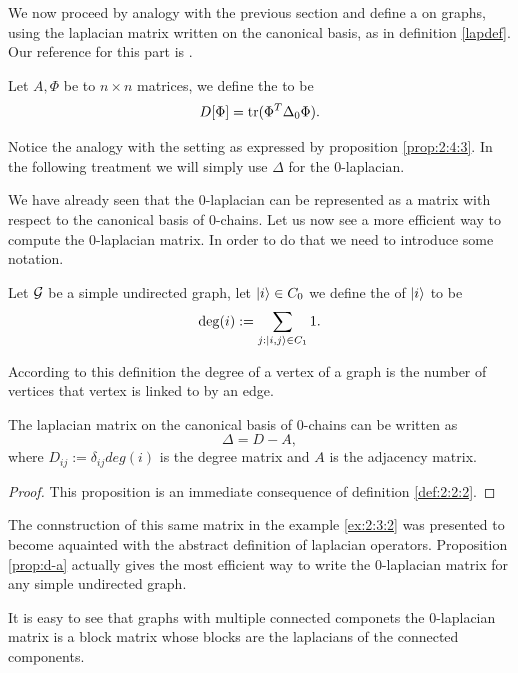 \documentclass[../2.tex]{subfiles}
\begin{document}
We now proceed by analogy with the previous section and define a  on graphs, using the laplacian matrix written on the canonical basis, as
in definition \ref{lapdef}.
Our reference for this part is \cite{bronstein}.

\begin{defn}
    Let $A,\Phi$ be to $n\times n$ matrices, we define the  to be 
    \[ D[\Phi] = \operatorname{tr}(\Phi^T \Delta_0 \Phi). \]
\end{defn}

Notice the analogy with the setting as expressed by proposition \ref{prop:2:4:3}.
In the following treatment we will simply use $\Delta$ for the $0$-laplacian.

We have already seen that the $0$-laplacian can be represented as a matrix with respect to the canonical basis
of $0$-chains. Let us now see a more efficient way to compute the $0$-laplacian matrix. In order to do that we need to introduce some notation.

\begin{defn}
    Let $\mathcal{G}$ be a simple undirected graph, let $| i \rangle \in C_0$ we define the  of $| i \rangle$ to be 
    \[ \operatorname{deg}(i) := \sum_{j : | i,j \rangle \in C_1} 1. \]
\end{defn}

According to this definition the degree of a vertex of a graph is the number of vertices that vertex is linked to by an edge.

\begin{prop}
    The laplacian matrix on the canonical basis of $0$-chains can be written as
    \[ \Delta = D - A, \]
    where $D_{ij} := \delta_{ij}deg(i)$ is the degree matrix and $A$ is the adjacency matrix.
    \label{prop:d-a}
\end{prop}
\begin{proof}
    This proposition is an immediate consequence of definition \ref{def:2:2:2}. \qedhere
\end{proof}

The connstruction of this same matrix in the example \ref{ex:2:3:2} was presented to become aquainted with the abstract definition of laplacian operators.
Proposition \ref{prop:d-a} actually gives the most efficient way to write the $0$-laplacian matrix for any simple undirected graph.

It is easy to see that graphs with multiple connected componets the $0$-laplacian matrix is a block matrix whose blocks are the laplacians of the connected components.
\end{document}
